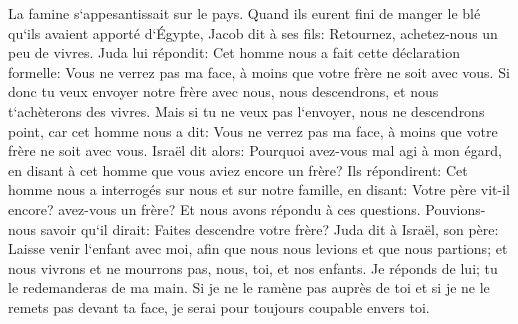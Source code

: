 \verse La famine s`appesantissait sur le pays. 
\verse Quand ils eurent fini de manger le blé qu`ils avaient apporté d`Égypte, Jacob dit à ses fils: Retournez, achetez-nous un peu de vivres. 
\verse Juda lui répondit: Cet homme nous a fait cette déclaration formelle: Vous ne verrez pas ma face, à moins que votre frère ne soit avec vous. 
\verse Si donc tu veux envoyer notre frère avec nous, nous descendrons, et nous t`achèterons des vivres. 
\verse Mais si tu ne veux pas l`envoyer, nous ne descendrons point, car cet homme nous a dit: Vous ne verrez pas ma face, à moins que votre frère ne soit avec vous. 
\verse Israël dit alors: Pourquoi avez-vous mal agi à mon égard, en disant à cet homme que vous aviez encore un frère? 
\verse Ils répondirent: Cet homme nous a interrogés sur nous et sur notre famille, en disant: Votre père vit-il encore? avez-vous un frère? Et nous avons répondu à ces questions. Pouvions-nous savoir qu`il dirait: Faites descendre votre frère? 
\verse Juda dit à Israël, son père: Laisse venir l`enfant avec moi, afin que nous nous levions et que nous partions; et nous vivrons et ne mourrons pas, nous, toi, et nos enfants. 
\verse Je réponds de lui; tu le redemanderas de ma main. Si je ne le ramène pas auprès de toi et si je ne le remets pas devant ta face, je serai pour toujours coupable envers toi. 
